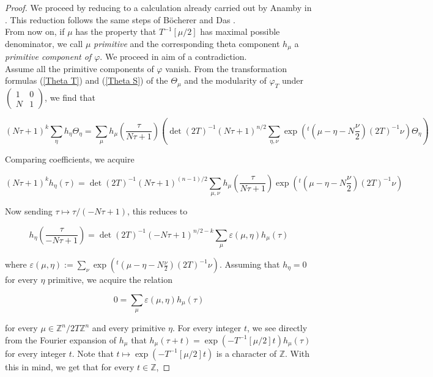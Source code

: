 \documentclass[11pt]{article}
\theoremstyle{definition}
\theoremstyle{remark}
\newcommand{\Z}{\mathbb{Z}}
\begin{document}
\begin{proof}

We proceed by reducing to a calculation already carried out by Anamby in \cite{anamby}. This reduction follows the same steps of B\"ocherer and Das \cite{BD}.\\

From now on, if $\mu$ has the property that $T^{-1}[\mu/2]$ has maximal possible denominator, we call $\mu$ \textit{primitive} and the corresponding theta component $h_\mu$ a \textit{primitive component of $\varphi$}. We proceed in aim of a contradiction. \\

Assume all the primitive components of $\varphi$ vanish. From the transformation formulas (\ref{Theta T}) and (\ref{Theta S}) of the $\Theta_\mu$ and the modularity of $\varphi_T$ under $\begin{pmatrix}
    1 & 0 \\ N & 1
\end{pmatrix}$, we find that 

\[
(N\tau + 1)^k \sum_\eta h_\eta \Theta_\eta = \sum_\mu h_\mu\left(\frac{\tau}{N\tau+1}\right) \left(\det(2T)^{-1}(N\tau+1)^{n/2} \sum_{\eta,\nu} \exp\left(^t (\mu - \eta - N\frac{\nu}{2})(2T)^{-1}\nu\right) \Theta_\eta\right)
\]

Comparing coefficients, we acquire 

\[
(N\tau+1)^kh_\eta(\tau) = \det(2T)^{-1} (N\tau+1)^{(n-1)/2} \sum_{\mu, \nu} h_\mu\left(\frac{\tau}{N\tau+1}\right) \exp\left(^t( \mu - \eta - N\frac{\nu}{2})(2T)^{-1}\nu\right)
\]

Now sending $\tau \mapsto \tau/(-N\tau +1)$, this reduces to 

\[
h_\eta\left(\frac{\tau}{-N\tau+1}\right) = \det(2T)^{-1} (-N\tau+1)^{n/2 - k} \sum_\mu \varepsilon(\mu,\eta) h_\mu(\tau)
\]

where $\displaystyle \varepsilon(\mu,\eta) := \sum_\nu \exp\left(^t (\mu - \eta - N\frac{\nu}{2})(2T)^{-1}\nu\right)$. Assuming that $h_\eta = 0$ for every $\eta$ primitive, we acquire the relation 

\begin{equation}
    0 = \sum_\mu \varepsilon(\mu,\eta) h_\mu(\tau) \label{nonreduced relation}
\end{equation}

for every $\mu \in \mathbb{Z}^n/2T\mathbb{Z}^n$ and every primitive $\eta$. For every integer $t$, we see directly from the Fourier expansion of $h_\mu$ that $h_\mu(\tau + t) = \exp(- T^{-1}[\mu/2] t) h_\mu(\tau)$ for every integer $t$. Note that $t \mapsto \exp(-T^{-1}[\mu/2] t)$ is a character of $\mathbb{Z}$. With this in mind, we get that for every $t \in \Z$,


\end{proof}
\end{document}

